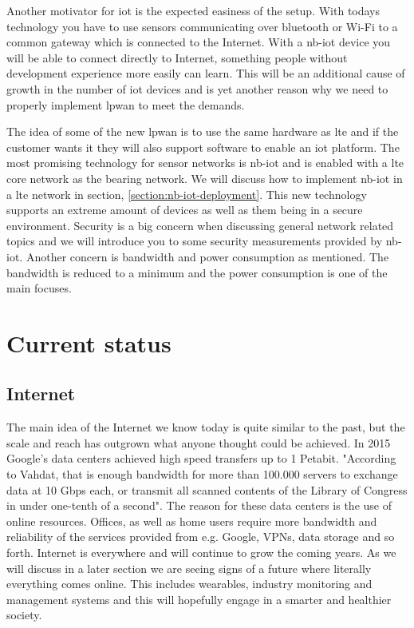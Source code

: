 \documentclass[USenglish]{ifimaster}  %
\begin{document}
Another motivator for \acrshort{iot} is the expected easiness of the setup. With todays technology you have to use sensors communicating over bluetooth or Wi-Fi to a common gateway which is connected to the Internet. With a \acrshort{nb-iot} device you will be able to connect directly to Internet, something people without development experience more easily can learn. This will be an additional cause of growth in the number of \acrshort{iot} devices and is yet another reason why we need to properly implement \acrshort{lpwan} to meet the demands.

The idea of some of the new \acrfull{lpwan} is to use the same hardware as \acrshort{lte} and if the customer wants it they will also support software to enable an \acrshort{iot} platform. The most promising technology for sensor networks is \acrfull{nb-iot} and is enabled with a \acrshort{lte} core network as the bearing network. We will discuss how to implement \acrshort{nb-iot} in a \acrshort{lte} network in section, \vref{section:nb-iot-deployment}. This new technology supports an extreme amount of devices as well as them being in a secure environment. Security is a big concern when discussing general network related topics and we will introduce you to some security measurements provided by \acrshort{nb-iot}. Another concern is bandwidth and power consumption as mentioned. The bandwidth is reduced to a minimum and the power consumption is one of the main focuses.

\section{Current status}
\subsection{Internet}
The main idea of the Internet we know today is quite similar to the past, but the scale and reach has outgrown what anyone thought could be achieved. In 2015 Google's data centers achieved high speed transfers up to 1 Petabit. "According to Vahdat, that is enough bandwidth for more than 100.000 servers to exchange data at 10 Gbps each, or transmit all scanned contents of the Library of Congress in under one-tenth of a second"\cite{online:petabitGoogle}. The reason for these data centers is the use of online resources. Offices, as well as home users require more bandwidth and reliability of the services provided from e.g. Google, VPNs, data storage and so forth.
Internet is everywhere and will continue to grow the coming years. As we will discuss in a later section we are seeing signs of a future where literally everything comes online. This includes wearables, industry monitoring and management systems and this will hopefully engage in a smarter and healthier society.
\end{document}
